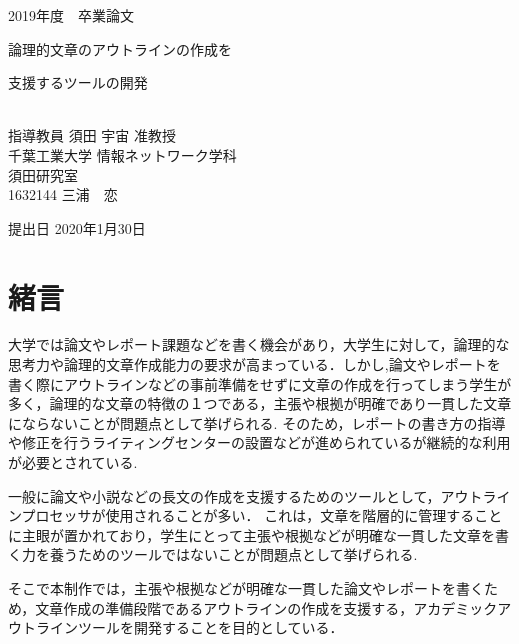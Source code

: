 \documentclass[a4j,12pt]{jarticle}
\begin{document}
\begin{center}
\thispagestyle{empty}
\vspace*{5zh}
\huge
2019年度　卒業論文\\[50pt]
{\Huge 論理的文章のアウトラインの作成を

支援するツールの開発}\\
[80pt]
\huge
指導教員 須田 宇宙 准教授\\[30pt]
千葉工業大学 情報ネットワーク学科\\[10pt]
須田研究室\\[60pt]
1632144 \hspace{70pt} 三浦　恋\\[75pt]
\end{center}
\vspace*{-2cm}
\begin{flushright} 
\huge
提出日 2020年1月30日
\end{flushright}
\large
\newpage
{}
\tableofcontents%
\newpage
{}
\listoffigures
\thispagestyle{empty}
\clearpage
\addtocounter{page}{-1}



\newpage

\section{緒言}

大学では論文やレポート課題などを書く機会があり，大学生に対して，論理的な思考力や論理的文章作成能力の要求が高まっている．しかし,論文やレポートを書く際にアウトラインなどの事前準備をせずに文章の作成を行ってしまう学生が多く，論理的な文章の特徴の１つである，主張や根拠が明確であり一貫した文章にならないことが問題点として挙げられる.
そのため，レポートの書き方の指導や修正を行うライティングセンターの設置などが進められているが継続的な利用が必要とされている.

一般に論文や小説などの長文の作成を支援するためのツールとして，アウトラインプロセッサが使用されることが多い．
これは，文章を階層的に管理することに主眼が置かれており，学生にとって主張や根拠などが明確な一貫した文章を書く力を養うためのツールではないことが問題点として挙げられる.

そこで本制作では，主張や根拠などが明確な一貫した論文やレポートを書くため，文章作成の準備段階であるアウトラインの作成を支援する，アカデミックアウトラインツールを開発することを目的としている．
\newpage
\end{document}
